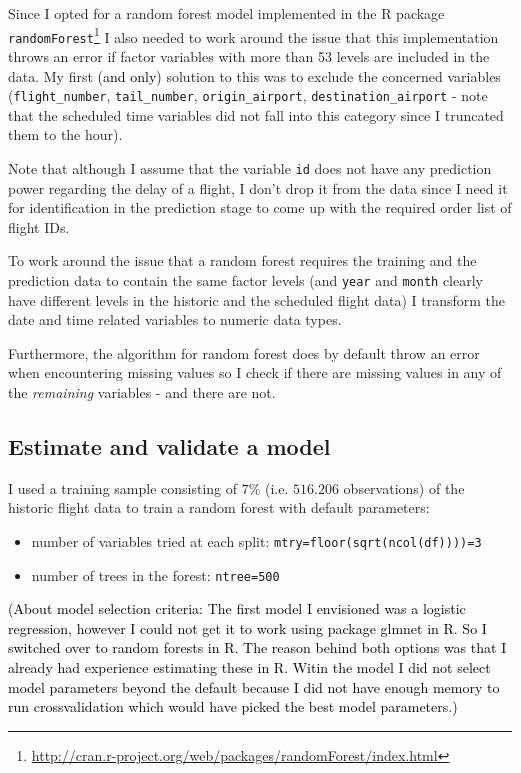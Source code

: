 \documentclass{article}\usepackage[]{graphicx}\usepackage[]{color}
\begin{document}
Since I opted for a random forest model implemented in the R package \verb+randomForest+\footnote{\url{http://cran.r-project.org/web/packages/randomForest/index.html}} I also needed to work around the issue that this implementation throws an error if factor variables with more than 53 levels are included in the data. My first \textcolor{black}{(and only)} solution to this was to exclude the concerned variables (\verb+flight_number+, \verb+tail_number+, \verb+origin_airport+, \verb+destination_airport+ - note that the scheduled time variables did not fall into this category since I truncated them to the hour).

Note that although I assume that the variable \verb+id+ does not have any prediction power regarding the delay of a flight, I don't drop it from the data since I need it for identification in the prediction stage to come up with the required order list of flight IDs. 

To work around the issue that a random forest requires the training and the prediction data to contain the same factor levels (and \verb+year+ and \verb+month+ clearly have different levels in the historic and the scheduled flight data) I transform the date and time related variables to numeric data types.

Furthermore, the algorithm for random forest does by default throw an error when encountering missing values so I check if there are missing values in any of the \textit{remaining} variables - and there are not.


\subsection{Estimate and validate a model} %
\label{sub:estimate_and_validate_a_model}

I used a training sample consisting of $7\%$ (i.e. $516.206$ observations) of the historic flight data to train a random forest with default parameters:
\begin{itemize}
	\item number of variables tried at each split: \verb+mtry=floor(sqrt(ncol(df))))=3+ 
	\item number of trees in the forest: \verb+ntree=500+
\end{itemize}


\textcolor{black}{(About model selection criteria: The first model I envisioned was a logistic regression, however I could not get it to work using package glmnet in R. So I switched over to random forests in R. The reason behind both options was that I already had experience estimating these in R. Witin the model I did not select model parameters beyond the default because I did not have enough memory to run crossvalidation which would have picked the best model parameters.)}
\end{document}
